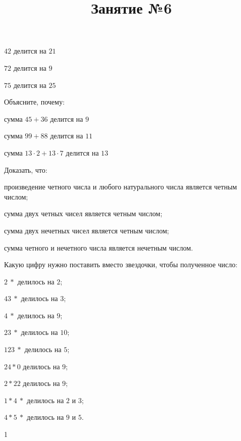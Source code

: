 \begin{listofex}
\begin{enumcols}[itemcolumns=3]
		\item \( 42 \) делится на \( 21 \)
		\item \( 72 \) делится на \( 9 \)
		\item \( 75 \) делится на \( 25 \)
	\end{enumcols}
	\item Объясните, почему:
	\begin{enumcols}[itemcolumns=2]
		\item сумма \( 45+36 \) делится на \( 9 \)
		\item сумма \( 99+88 \) делится на \( 11 \)
		\item сумма \( 13\cdot2+13\cdot7\) делится на \( 13 \)
	\end{enumcols}
	\item Доказать, что:
	\begin{enumcols}[itemcolumns=1]
		\item произведение четного числа и любого натурального числа является четным числом;
		\item сумма двух четных чисел является четным числом;
		\item сумма двух нечетных чисел является четным числом;
		\item сумма четного и нечетного числа является нечетным числом.
	\end{enumcols}
	\item Какую цифру нужно поставить вместо звездочки, чтобы полученное число:
	\begin{enumcols}[itemcolumns=3]
		\item \( 2\:* \) делилось на \( 2 \);
		\item \( 43\:* \) делилось на \( 3 \);
		\item \( 4\:* \) делилось на \( 9 \);
		\item \( 23\:* \) делилось на \( 10 \);
		\item \( 123\:* \) делилось на \( 5 \);
		\item \( 24*0 \) делилось на \( 9 \);
		\item \( 2*22 \) делилось на \( 9 \);
		\item \( 1*4\:* \) делилось на \( 2 \) и \( 3 \);
		\item \( 4*5\:* \) делилось на \( 9 \) и \( 5 \).
	\end{enumcols}
\end{listofex}
\newpage
\title{Занятие №6}
\begin{listofex}
	\item 1
\end{listofex}
